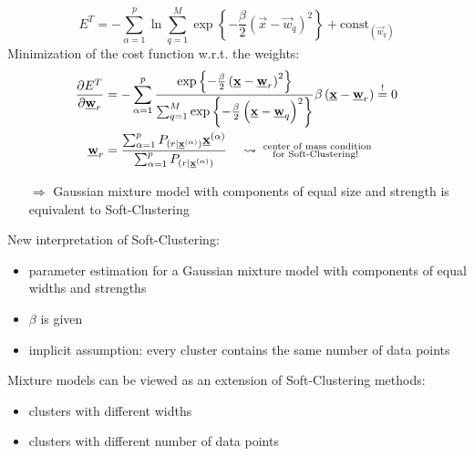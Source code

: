 \begin{equation}
E^T = - \sum_{\alpha=1}^{p} \ln \sum_{q=1}^{M} \exp \left\{ - \frac{\beta}{2} \left( \vec{x} - \vec{w}_q \right)^2 \right\} + \text{const}_{(\vec{w}_q)}
\end{equation}
Minimization of the cost function w.r.t. the weights:
\begin{align}
\frac{\partial E^T}{\partial \underline{\mathbf{w}}_r} &= - \sum_{\alpha=1}^{p} \frac{\exp \left\{ - \frac{\beta}{2} \left( \underline{\mathbf{x}} - \underline{\mathbf{w}}_r \right)^2 \right\}}{\sum_{q=1}^{M} \exp \left\{ - \frac{\beta}{2} \left( \underline{\mathbf{x}} - \underline{\mathbf{w}}_q \right)^2 \right\}} \beta \left( \underline{\mathbf{x}} - \underline{\mathbf{w}}_r \right) \stackrel{\mathrm{!}}{=} 0 \\
\underline{\mathbf{w}}_r &= \frac{\sum_{\alpha=1}^{p} P_{(r | \underline{\mathbf{x}}^{(\alpha)})} \underline{\mathbf{x}}^{(\alpha)}}{\sum_{\alpha=1}^{p} P_{(r | \underline{\mathbf{x}}^{(\alpha)})}} \quad \leadsto \substack{\text{ center of mass condition}\\\text{for Soft-Clustering!}}
\end{align}
\begin{itemize}
	\item[\textcolor{black}{$\Rightarrow$}] Gaussian mixture model with components of equal size and strength is equivalent to Soft-Clustering
\end{itemize}
New interpretation of Soft-Clustering:
\begin{itemize}
	\item parameter estimation for a Gaussian mixture model with components of equal widths and strengths
	\item $\beta$ is given
	\item implicit assumption: every cluster contains the same number of data points
\end{itemize}
\vspace{0.5cm}
Mixture models can be viewed as an extension of Soft-Clustering methods:
\begin{itemize}
	\item clusters with different widths
	\item clusters with different number of data points
\end{itemize}
